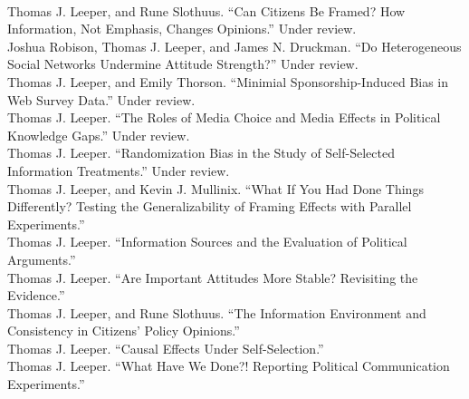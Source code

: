 \documentclass[12pt]{article}
\newcommand{\topic}[1]{\pagebreak[3]\indent {\color{lg}{\footnotesize #1 }}\\}
\newcommand{\entry}[1]{\indent {\color{lg}\guillemotright}\hspace{2pt}#1\vspace{.25em}\\}
\begin{document}
\topic{Working Papers and Papers Under Review}
\entry{Thomas J. Leeper, and Rune Slothuus. ``Can Citizens Be Framed? How Information, Not Emphasis, Changes Opinions.'' Under review.}
\entry{Joshua Robison, Thomas J. Leeper, and James N. Druckman. ``Do Heterogeneous Social Networks Undermine Attitude Strength?'' Under review.}
\entry{Thomas J. Leeper, and Emily Thorson. ``Minimial Sponsorship-Induced Bias in Web Survey Data.'' Under review.}
\entry{Thomas J. Leeper. ``The Roles of Media Choice and Media Effects in Political Knowledge Gaps.'' Under review.}
\entry{Thomas J. Leeper. ``Randomization Bias in the Study of Self-Selected Information Treatments.'' Under review.}
\entry{Thomas J. Leeper, and Kevin J. Mullinix. ``What If You Had Done Things Differently? Testing the Generalizability of Framing Effects with Parallel Experiments.''}
\entry{Thomas J. Leeper. ``Information Sources and the Evaluation of Political Arguments.''}
\entry{Thomas J. Leeper. ``Are Important Attitudes More Stable? Revisiting the Evidence.''}
\entry{Thomas J. Leeper, and Rune Slothuus. ``The Information Environment and Consistency in Citizens' Policy Opinions.''}
\entry{Thomas J. Leeper. ``Causal Effects Under Self-Selection.''}
\entry{Thomas J. Leeper. ``What Have We Done?! Reporting Political Communication Experiments.''}
\end{document}
